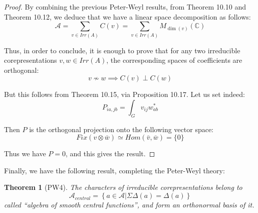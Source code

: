 \documentclass[12pt]{amsbook}
\newtheorem{theorem}{Theorem}[chapter]
\begin{document}
\begin{proof}
By combining the previous Peter-Weyl results, from Theorem 10.10 and Theorem 10.12, we deduce that we have a linear space decomposition as follows:
$$\mathcal A
=\sum_{v\in Irr(A)}C(v)
=\sum_{v\in Irr(A)}M_{\dim(v)}(\mathbb C)$$

Thus, in order to conclude, it is enough to prove that for any two irreducible corepresentations $v,w\in Irr(A)$, the corresponding spaces of coefficients are orthogonal:
$$v\not\sim w\implies C(v)\perp C(w)$$ 

But this follows from Theorem 10.15, via Proposition 10.17. Let us set indeed:
$$P_{ia,jb}=\int_Gv_{ij}w_{ab}^*$$

Then $P$ is the orthogonal projection onto the following vector space:
$$Fix(v\otimes\bar{w})
\simeq Hom(\bar{v},\bar{w})
=\{0\}$$

Thus we have $P=0$, and this gives the result.
\end{proof}

Finally, we have the following result, completing the Peter-Weyl theory:


\begin{theorem}[PW4]
The characters of irreducible corepresentations belong to
$$\mathcal A_{central}=\left\{a\in\mathcal A\Big|\Sigma\Delta(a)=\Delta(a)\right\}$$
called ``algebra of smooth central functions'', and form an orthonormal basis of it.
\end{theorem}
\end{document}
